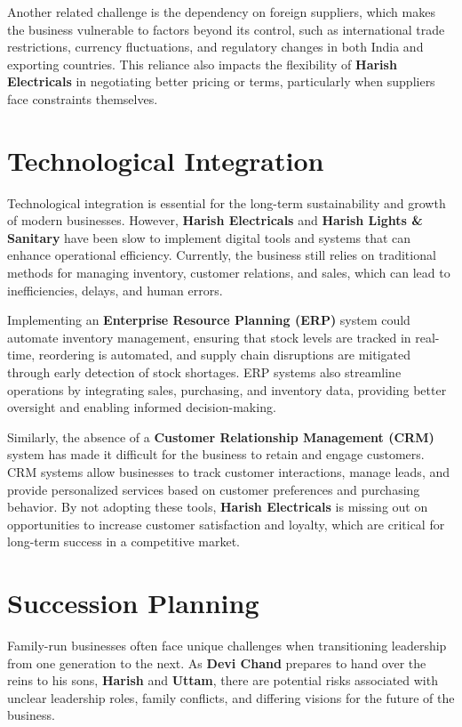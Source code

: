 \documentclass[a4paper,12pt]{report}
\begin{document}
Another related challenge is the dependency on foreign suppliers, which makes the business vulnerable to factors beyond its control, such as international trade restrictions, currency fluctuations, and regulatory changes in both India and exporting countries. This reliance also impacts the flexibility of \textbf{Harish Electricals} in negotiating better pricing or terms, particularly when suppliers face constraints themselves.

\section{Technological Integration}
Technological integration is essential for the long-term sustainability and growth of modern businesses. However, \textbf{Harish Electricals} and \textbf{Harish Lights \& Sanitary} have been slow to implement digital tools and systems that can enhance operational efficiency. Currently, the business still relies on traditional methods for managing inventory, customer relations, and sales, which can lead to inefficiencies, delays, and human errors.

Implementing an \textbf{Enterprise Resource Planning (ERP)} system could automate inventory management, ensuring that stock levels are tracked in real-time, reordering is automated, and supply chain disruptions are mitigated through early detection of stock shortages. ERP systems also streamline operations by integrating sales, purchasing, and inventory data, providing better oversight and enabling informed decision-making.

Similarly, the absence of a \textbf{Customer Relationship Management (CRM)} system has made it difficult for the business to retain and engage customers. CRM systems allow businesses to track customer interactions, manage leads, and provide personalized services based on customer preferences and purchasing behavior. By not adopting these tools, \textbf{Harish Electricals} is missing out on opportunities to increase customer satisfaction and loyalty, which are critical for long-term success in a competitive market.

\section{Succession Planning}
Family-run businesses often face unique challenges when transitioning leadership from one generation to the next. As \textbf{Devi Chand} prepares to hand over the reins to his sons, \textbf{Harish} and \textbf{Uttam}, there are potential risks associated with unclear leadership roles, family conflicts, and differing visions for the future of the business.
\end{document}
